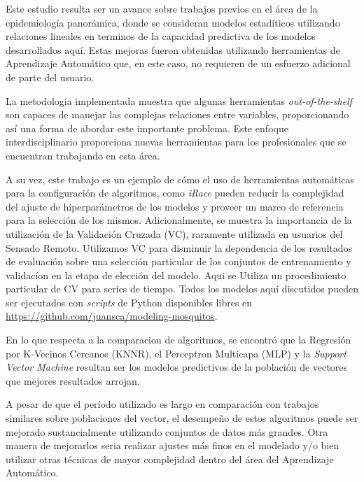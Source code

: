   \par Este estudio resulta ser un avance sobre trabajos previos en el área
    de la epidemiología panorámica, donde se consideran modelos estadíticos utilizando
    relaciones lineales \cite{models_predicting, modis_data, ndwi_erffectiveness}
    en terminos de la capacidad predictiva de los modelos desarrollados aquí.
    Estas mejoras fueron obtenidas utilizando herramientas de Aprendizaje
    Automático que, en este caso, no requieren de un esfuerzo adicional de
    parte del usuario.

  \par La metodologia implementada muestra que algunas herramientas \textit{out-of-the-shelf}
    son capaces de manejar las complejas relaciones entre variables, proporcionando
    así una forma de abordar este importante problema. Este enfoque interdisciplinario
    proporciona nuevas herramientas para los profesionales que se encuentran
    trabajando en esta área.

  \par A su vez, este trabajo es un ejemplo de cómo el uso de herramientas
    automáticas para la configuración de algoritmos, como \textit{iRace} pueden
    reducir la complejidad del ajuste de hiperparámetros de los modelos y
    proveer un marco de referencia para la selección de los mismos.
    Adicionalmente, se muestra la importancia de la utilización de la Validación
    Cruzada (VC), raramente utilizada en usuarios del Sensado Remoto.
    Utilizamos VC para disminuir la dependencia de los resultados de evaluación
    sobre una selección particular de los conjuntos de entrenamiento y validacíon
    en la etapa de elección del modelo. Aqui se Utiliza
    un procedimiento particular de CV para series de tiempo. Todos los modelos
    aquí discutidos pueden ser ejecutados con \textit{scripts} de Python
    disponibles libres en \url{https://github.com/juansca/modeling-mosquitos}.

  \par En lo que respecta a la comparacion de algoritmos, se encontró que la Regresión
    por K-Vecinos Cercanos (KNNR), el Perceptron Multicapa (MLP) y la
    \textit{Support Vector Machine} resultan ser los modelos predictivos de la
    población de vectores que mejores resultados arrojan.


  \par A pesar de que el período utilizado es largo en comparación con trabajos similares
    sobre poblaciones del vector, el desempeño de estos algoritmos puede ser
    mejorado sustancialmente utilizando conjuntos de datos más grandes.
    Otra manera de mejorarlos seria realizar ajustes más finos en el modelado
    y/o bien utilizar otras técnicas de mayor complejidad dentro del área del
    Aprendizaje Automático.

